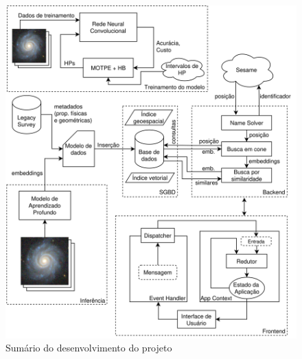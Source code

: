 \begin{figure}[!ht]
  \centering
  \caption{Sumário do desenvolvimento do projeto}
  \label{fig:diagrama-completo}
  \includegraphics[width=\linewidth]{figures/full_diagram.png}
\end{figure}

\chaptersep


